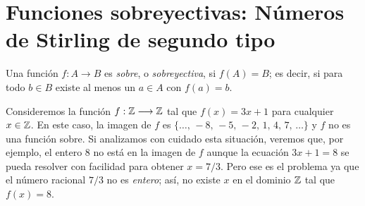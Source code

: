 \section{Funciones sobreyectivas: Números de Stirling de segundo tipo}

\begin{definicion}{}{}
    Una función $f:A \longrightarrow B$ es \textit{sobre}, o \textit{sobreyectiva}, si $f(A) = B$; es decir, si para todo $b \in B$ existe al menos un $a \in A$ con $f(a) = b$.
\end{definicion}

\begin{myexample}
    Consideremos la función $f: \ZZ \longrightarrow \ZZ$ tal que $f(x) = 3x + 1$ para cualquier $x \in \ZZ$. En este caso, la imagen de $f$ es $\{ \dots , \, -8, \, -5, \, -2, \, 1, \, 4, \, 7, \, \dots \}$ y $f$ no es una función sobre. Si analizamos con cuidado esta situación, veremos que, por ejemplo, el entero 8 no está en la imagen de $f$ aunque la ecuación $3x + 1 = 8$ se pueda resolver con facilidad para obtener $x =7/3$. Pero ese es el problema ya que el número racional $7/3$ no es \textit{entero}; así, no existe $x$ en el dominio $\ZZ$ tal que $f(x) = 8$.
\end{myexample}

\newpage

